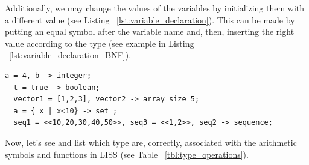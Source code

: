 \documentclass[
  oneside,
  11pt, a4paper,
  footinclude=true,
  headinclude=true,
  cleardoublepage=empty
]{scrbook}
\begin{document}
\newpage
Additionally, we may change the values of the variables by initializing them with a different value (see Listing ~\ref{lst:variable_declaration}).
This can be made by putting an equal symbol after the variable name and, then, inserting the right value according to the type (see example in Listing ~\ref{lst:variable_declaration_BNF}).

\begin{lstlisting}[caption={Initialize a variable},label={lst:variable_declaration}]
  a = 4, b -> integer;
  t = true -> boolean;
  vector1 = [1,2,3], vector2 -> array size 5;
  a = { x | x<10} -> set ;
  seq1 = <<10,20,30,40,50>>, seq3 = <<1,2>>, seq2 -> sequence;
\end{lstlisting}

Now, let's see and list which type are, correctly, associated with the arithmetic symbols and functions in LISS (see Table ~\ref{tbl:type_operations}).
\end{document}
